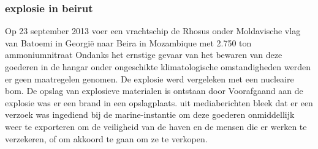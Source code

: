 \documentclass{article}
\begin{document}
	\subsubsection{explosie in beirut}
	Op 23 september 2013 voer een vrachtschip de Rhosus onder Moldavische vlag van Batoemi in Georgië naar Beira in Mozambique met 2.750 ton ammoniumnitraat
	Ondanks  het ernstige gevaar van het bewaren van deze goederen in de hangar onder ongeschikte klimatologische omstandigheden werden er geen maatregelen genomen. 
	De explosie werd vergeleken met een nucleaire bom. De opslag van explosieve  materialen is ontstaan door Voorafgaand aan de explosie was er een brand in een opslagplaats. 
	uit mediaberichten bleek dat er een verzoek was ingediend bij de marine-instantie om deze goederen onmiddellijk weer te exporteren om de veiligheid van de haven en de mensen die er werken te verzekeren, of om akkoord te gaan om ze te verkopen.
	
\end{document}
